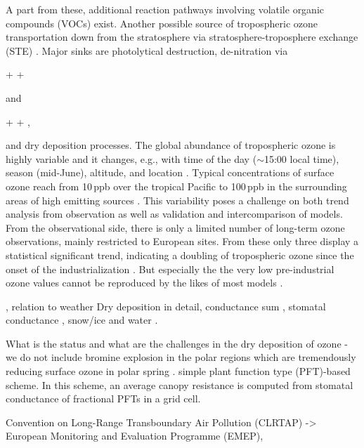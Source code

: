 \documentclass[gmd, manuscript]{copernicus}
\begin{document}
A part from these, additional reaction pathways involving volatile organic compounds (VOCs) exist. Another possible source of tropospheric ozone transportation down from the stratosphere via stratosphere-troposphere exchange (STE) \citep{WMO2014}. Major sinks are photolytical destruction, de-nitration via
\begin{reaction}
   +  \rightarrow {} + 
\end{reaction}
and
\begin{reaction}
   +  \rightarrow {} + ,
\end{reaction}
and dry deposition processes. The global abundance of tropospheric ozone is highly variable and it changes, e.g., with time of the day ($\sim$15:00 local time), season (mid-June), altitude, and location \citep{ACP:Schnell2015}. Typical concentrations of surface ozone reach from 10\,\unit{ppb} over the tropical Pacific to 100\,\unit{ppb} in the surrounding areas of high emitting sources \citep[Chapter 8]{IPCC2013}. This variability poses a challenge on both trend analysis from observation as well as validation and intercomparison of models. From the observational side, there is only a limited number of long-term ozone observations, mainly restricted to European sites. From these only three display a statistical significant trend, indicating a doubling of tropospheric ozone since the onset of the industrialization \citep[Chapter 2]{IPCC2013}. But especially the the very low pre-industrial ozone values cannot be reproduced by the likes of most models \citep[Chapter 8]{IPCC2013}. 

, relation to weather \citep{ACP:Otero2018}
Dry deposition in detail, conductance sum \citep{AE:Wesely1989}, stomatal conductance \citep{PP:Buckley2017}, snow/ice \citep{ACP:Helmig2007,AE:Oltmans2008} and water \citep{JGR:Helmig2012,ACP:Luhar2017}.

What is the status and what are the challenges in the dry deposition of ozone - we do not include bromine explosion in the polar regions which are tremendously reducing surface ozone in polar spring \citep{JGR:Oltmans1981,GRL:Bottenheim1986,Nat:Barrie1988,JGR:Bottenheim2006}.
simple plant function type (PFT)-based scheme. In this scheme, an average canopy resistance is computed from stomatal conductance of fractional PFTs in a grid cell.

Convention on Long-Range Transboundary Air Pollution (CLRTAP) -> European Monitoring and Evaluation Programme (EMEP),
\end{document}
